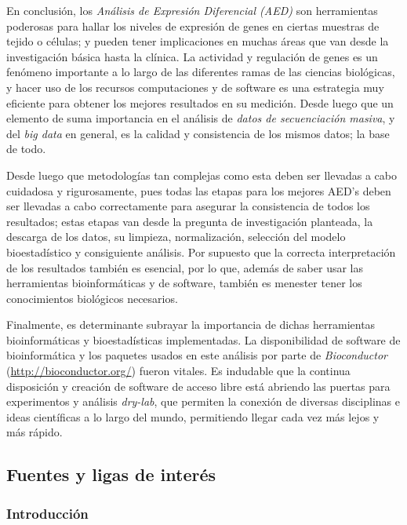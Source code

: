 \documentclass[
]{article}
\begin{document}
En conclusión, los \emph{Análisis de Expresión Diferencial (AED)} son
herramientas poderosas para hallar los niveles de expresión de genes en
ciertas muestras de tejido o células; y pueden tener implicaciones en
muchas áreas que van desde la investigación básica hasta la clínica. La
actividad y regulación de genes es un fenómeno importante a lo largo de
las diferentes ramas de las ciencias biológicas, y hacer uso de los
recursos computaciones y de software es una estrategia muy eficiente
para obtener los mejores resultados en su medición. Desde luego que un
elemento de suma importancia en el análisis de \emph{datos de
secuenciación masiva}, y del \emph{big data} en general, es la calidad y
consistencia de los mismos datos; la base de todo.

Desde luego que metodologías tan complejas como esta deben ser llevadas
a cabo cuidadosa y rigurosamente, pues todas las etapas para los mejores
AED's deben ser llevadas a cabo correctamente para asegurar la
consistencia de todos los resultados; estas etapas van desde la pregunta
de investigación planteada, la descarga de los datos, su limpieza,
normalización, selección del modelo bioestadístico y consiguiente
análisis. Por supuesto que la correcta interpretación de los resultados
también es esencial, por lo que, además de saber usar las herramientas
bioinformáticas y de software, también es menester tener los
conocimientos biológicos necesarios.

Finalmente, es determinante subrayar la importancia de dichas
herramientas bioinformáticas y bioestadísticas implementadas. La
disponibilidad de software de bioinformática y los paquetes usados en
este análisis por parte de \emph{Bioconductor}
(\url{http://bioconductor.org/}) fueron vitales. Es indudable que la
continua disposición y creación de software de acceso libre está
abriendo las puertas para experimentos y análisis \emph{dry-lab}, que
permiten la conexión de diversas disciplinas e ideas científicas a lo
largo del mundo, permitiendo llegar cada vez más lejos y más rápido.

\hypertarget{fuentes-y-ligas-de-interuxe9s}{%
\subsection{Fuentes y ligas de
interés}\label{fuentes-y-ligas-de-interuxe9s}}

\hypertarget{introducciuxf3n}{%
\subsubsection{Introducción}\label{introducciuxf3n}}
\end{document}
